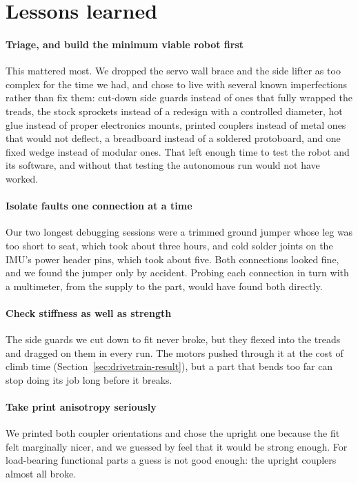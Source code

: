 \section{Lessons learned}
\label{sec:lessons}

\paragraph{Triage, and build the minimum viable robot first}
This mattered most. We dropped the servo wall brace and the side lifter as too complex for the time we had, and chose to live with several known imperfections rather than fix them: cut-down side guards instead of ones that fully wrapped the treads, the stock sprockets instead of a redesign with a controlled diameter, hot glue instead of proper electronics mounts, printed couplers instead of metal ones that would not deflect, a breadboard instead of a soldered protoboard, and one fixed wedge instead of modular ones. That left enough time to test the robot and its software, and without that testing the autonomous run would not have worked.

\paragraph{Isolate faults one connection at a time}
Our two longest debugging sessions were a trimmed ground jumper whose leg was too short to seat, which took about three hours, and cold solder joints on the IMU's power header pins, which took about five. Both connections looked fine, and we found the jumper only by accident. Probing each connection in turn with a multimeter, from the supply to the part, would have found both directly.

\paragraph{Check stiffness as well as strength}
The side guards we cut down to fit never broke, but they flexed into the treads and dragged on them in every run. The motors pushed through it at the cost of climb time (Section~\ref{sec:drivetrain-result}), but a part that bends too far can stop doing its job long before it breaks.

\paragraph{Take print anisotropy seriously}
We printed both coupler orientations and chose the upright one because the fit felt marginally nicer, and we guessed by feel that it would be strong enough. For load-bearing functional parts a guess is not good enough: the upright couplers almost all broke.

